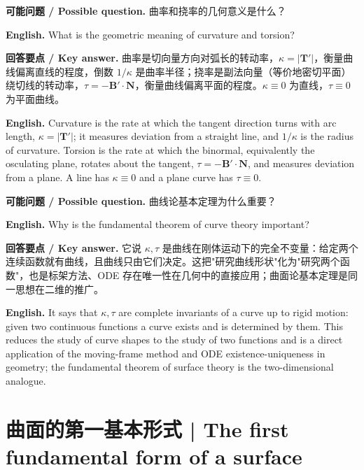 \documentclass[UTF8,11pt,a4paper]{ctexart}
\newcommand{\EN}[1]{\par\noindent \textbf{English.} #1\par}
\newcommand{\ASK}[4]{\par\noindent \textbf{可能问题 / Possible question.} #1\par\EN{#2}\noindent \textbf{回答要点 / Key answer.} #3\par\EN{#4}\medskip}
\newcommand{\bT}{\mathbf{T}}
\newcommand{\bN}{\mathbf{N}}
\newcommand{\bB}{\mathbf{B}}
\begin{document}
\ASK{曲率和挠率的几何意义是什么？}{What is the geometric meaning of curvature and torsion?}{曲率是切向量方向对弧长的转动率，$\kappa=|\bT'|$，衡量曲线偏离直线的程度，倒数 $1/\kappa$ 是曲率半径；挠率是副法向量（等价地密切平面）绕切线的转动率，$\tau=-\bB'\cdot\bN$，衡量曲线偏离平面的程度。$\kappa\equiv0$ 为直线，$\tau\equiv0$ 为平面曲线。}{Curvature is the rate at which the tangent direction turns with arc length, $\kappa=|\bT'|$; it measures deviation from a straight line, and $1/\kappa$ is the radius of curvature. Torsion is the rate at which the binormal, equivalently the osculating plane, rotates about the tangent, $\tau=-\bB'\cdot\bN$, and measures deviation from a plane. A line has $\kappa\equiv0$ and a plane curve has $\tau\equiv0$.}
\ASK{曲线论基本定理为什么重要？}{Why is the fundamental theorem of curve theory important?}{它说 $\kappa,\tau$ 是曲线在刚体运动下的完全不变量：给定两个连续函数就有曲线，且曲线只由它们决定。这把"研究曲线形状"化为"研究两个函数"，也是标架方法、ODE 存在唯一性在几何中的直接应用；曲面论基本定理是同一思想在二维的推广。}{It says that $\kappa,\tau$ are complete invariants of a curve up to rigid motion: given two continuous functions a curve exists and is determined by them. This reduces the study of curve shapes to the study of two functions and is a direct application of the moving-frame method and ODE existence-uniqueness in geometry; the fundamental theorem of surface theory is the two-dimensional analogue.}

\section[曲面的第一基本形式]{曲面的第一基本形式 | The first fundamental form of a surface}
\end{document}
